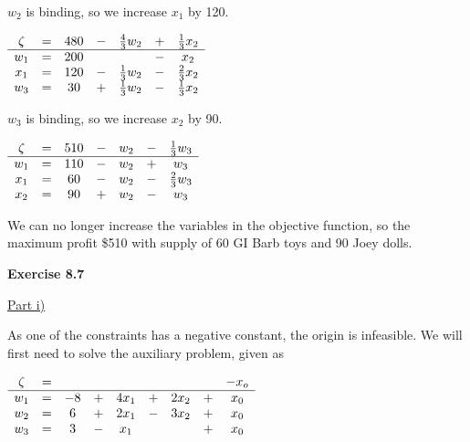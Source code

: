 \documentclass[letterpaper,12pt]{article}
\begin{document}
$w_2$ is binding, so we increase $x_1$ by 120. \\

\begin{center}
	$\begin{array}{ c c c c c c c c  }
	\zeta & = & 480 & - & \frac{4}{3}w_2 & + & \frac{1}{3}x_2 \\
	\hline
	w_1 & = & 200 & & & - & x_2 \\
	x_1 & = & 120 & - & \frac{1}{3}w_2 & - & \frac{2}{3}x_2 \\
	w_3 & = & 30 & + & \frac{1}{3}w_2 & - & \frac{1}{3}x_2 \\
	\end{array}$ \\
\end{center}

$w_3$ is binding, so we increase $x_2$ by 90. \\

\begin{center}
	$\begin{array}{ c c c c c c c c  }
	\zeta & = & 510 & - & w_2 & - & \frac{1}{3}w_3 \\
	\hline
	w_1 & = & 110 & - & w_2 & + & w_3 \\
	x_1 & = & 60 & - & w_2 & - & \frac{2}{3}w_3 \\
	x_2 & = & 90 & + & w_2 & - & w_3 \\
	\end{array}$ \\
\end{center}

We can no longer increase the variables in the objective function, so the maximum profit \$510 with supply of 60 GI Barb toys and 90 Joey dolls.

\textbf{Exercise 8.7}

\underline{Part i)}

As one of the constraints has a negative constant, the origin is infeasible. We will first need to solve the auxiliary problem, given as
\begin{center}
	$\begin{array}{ c c c c c c c c c c }
	\zeta & = &  &   &      &   &      &   & -x_o \\
	\hline
	w_1 & = & -8 & + & 4x_1 & + & 2x_2 & + & x_0 \\
	w_2 & = & 6  & + & 2x_1 & - & 3x_2 & + & x_0 \\
	w_3 & = & 3  & - & x_1  &   &      & + & x_0 \\
	\end{array}$ \\
\end{center}
\end{document}
